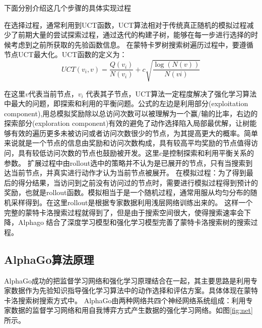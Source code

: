 下面分别介绍这几个步骤的具体实现过程

在选择过程，通常利用到UCT函数，UCT算法相对于传统真正随机的模拟过程减少了前期大量的尝试探索过程，通过迭代的构建子树，能够在每一步进行选择的时候考虑到之前所获取的先验函数信息。
在蒙特卡罗树搜索树遍历过程中，要遵循节点UCT最大化。UCT函数的定义为：
\begin{equation}
UCT({v_i},v) = \frac{{Q({v_i})}}{{N({v_i})}} + c\sqrt {\frac{{\log (N(v))}}{{N(vi)}}} 
\end{equation}

在这里$v$代表当前节点，$ v_i$ 代表其子节点，UCT算法一定程度解决了强化学习算法中最大的问题，即探索和利用的平衡问题。公式的左边是利用部分(exploitation component),用总模拟奖励除以总访问次数可以被理解为一个赢/输的比率，右边的探索部分(exploration component)有效的避免了动作选择陷入局部最优解，让树能够有效的遍历更多未被访问或者访问次数很少的节点，为其提高更大的概率。简单来说就是一个节点的信息由奖励和访问次数构成，具有较高平均奖励的节点值得访问，具有较低访问次数的节点也鼓励被开发。这里$c$是控制探索和利用平衡关系的参数。
扩展过程中由rollout选中的策略并不认为是已展开的节点，只有当搜索到达当前节点，并真实进行动作才认为当前节点被展开。
在模拟过程：为了得到最后的得分结果，当访问到之前没有访问过的节点时，需要进行模拟过程得到预计的奖励，也就是rollout函数。模拟相当于是一个随机过程，通常用服从均匀分布的随机采样得到。在这里rollout是根据专家数据利用浅层网络训练出来的。
这样一个完整的蒙特卡洛搜索过程就得到了，但是由于搜索空间很大，使得搜索速率会下降，Alphago 结合了深度学习模型和强化学习模型完善了蒙特卡洛搜索树的搜索过程。

\subsection{AlphaGo算法原理}
AlphaGo成功的把监督学习网络和强化学习原理结合在一起，其主要思路是利用专家数据作为先验知识指导强化学习算法中的动作选择和评估方案。具体体现在蒙特卡洛搜索树搜索方式中。
AlphaGo由两种网络共四个神经网络系统组成：利用专家数据的监督学习网络和用自我博弈方式产生数据的强化学习网络。如图\ref{fig:net}所示。


